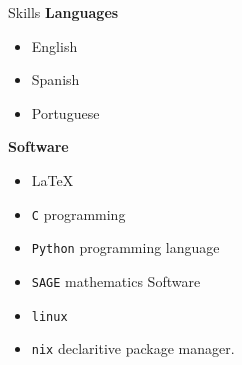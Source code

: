 \documentclass{resume}
\begin{document}
\begin{rSection}{Skills}
  \textbf{Languages}
  \begin{itemize}
    \item[] English

    \item[] Spanish

    \item[] Portuguese
  \end{itemize}

  \textbf{Software}
  \begin{itemize}
    \item[] \LaTeX

    \item[] \texttt{C} programming

    \item[] \texttt{Python} programming language

    \item[] \texttt{SAGE} mathematics Software

    \item[] \texttt{linux}

    \item[] \texttt{nix} declaritive package manager.
  \end{itemize}
\end{rSection}
\end{document}
